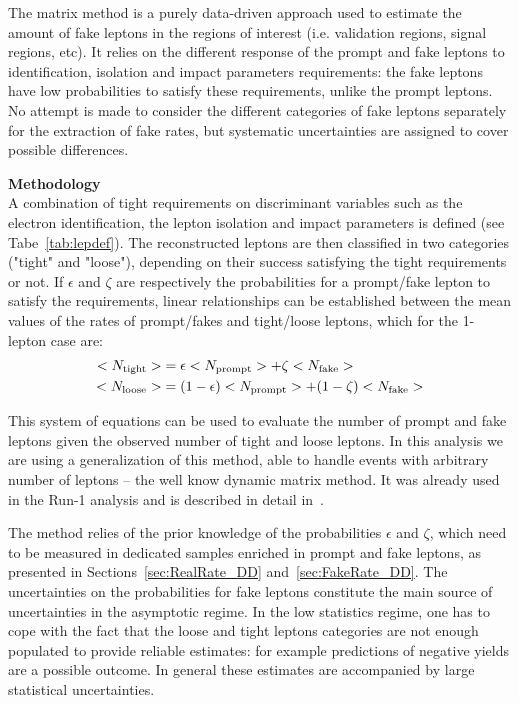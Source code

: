 The matrix method is a purely data-driven approach used to estimate the amount of fake leptons in the regions of interest (i.e. validation regions, signal regions, etc). It relies on the different response of the prompt and fake leptons to identification, isolation and impact parameters requirements: the fake leptons have low probabilities to satisfy these requirements, unlike the prompt leptons. 
No attempt is made to consider the different categories of fake leptons separately for the extraction of fake rates, but systematic uncertainties are assigned to cover possible differences. 

\par{\bf Methodology\\}
A combination of tight requirements on discriminant variables such as the electron identification, the lepton isolation and impact parameters is defined (see Tabe~\ref{tab:lepdef}). The reconstructed leptons are then classified in two categories ("tight" and "loose"), depending on their success satisfying the tight requirements or not. If $\epsilon$ and $\zeta$ are respectively the probabilities for a prompt/fake lepton to satisfy the requirements, linear relationships can be established between the mean values of the rates of prompt/fakes and tight/loose leptons, which for the 1-lepton case are: 
\begin{align}
\label{eqn:matrixmethod}
<N_\text{tight}> &= \epsilon <N_\text{prompt}> + \zeta <N_\text{fake}> \\\notag
<N_\text{loose}> &=  (1-\epsilon) <N_\text{prompt}> + (1-\zeta) <N_\text{fake}>
\end{align}

This system of equations can be used to evaluate the number of prompt and fake leptons given the observed number of tight and loose leptons. 
In this analysis we are using a generalization of this method, able to handle events with arbitrary number of leptons -- the well know dynamic matrix method. 
It was already used in the Run-1 analysis and is described in detail in~\cite{noteSS3L,TomThesis}. 

The method relies of the prior knowledge of the probabilities $\epsilon$ and $\zeta$, 
which need to be measured in dedicated samples enriched in prompt and fake leptons, as presented in Sections~\ref{sec:RealRate_DD} and~\ref{sec:FakeRate_DD}.
The uncertainties on the probabilities for fake leptons constitute the main source of uncertainties in the asymptotic regime. 
In the low statistics regime, one has to cope with the fact that the loose and tight leptons categories are not enough populated 
to provide reliable estimates: for example predictions of negative yields are a possible outcome. In general these estimates are accompanied by large statistical uncertainties. 

